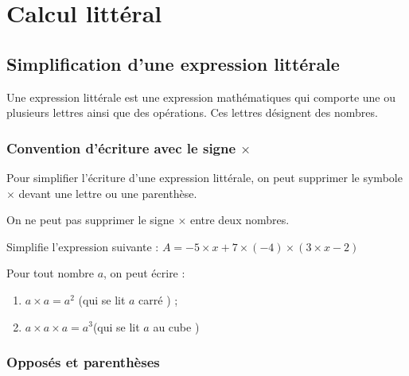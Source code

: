 \documentclass[a4paper,10pt]{report}
\begin{document}
\newpage
\setcounter{chapter}{5}
\chapter{Calcul littéral}

\section{Simplification d'une expression littérale}

\begin{defn}
Une expression littérale est une expression mathématiques qui comporte une ou plusieurs lettres ainsi que des opérations. Ces lettres désignent des nombres.
\end{defn}

\subsection{Convention d'écriture avec le signe $\times$}

\begin{memento}
Pour simplifier l'écriture d'une expression littérale, on peut supprimer le symbole $\times$ devant une lettre ou une parenthèse.
\end{memento}

\begin{rem}
On ne peut pas supprimer le signe $\times $ entre deux nombres.
\end{rem}

\begin{ex}
Simplifie l'expression suivante : $A=-5 \times x+7 \times (-4) \times (3 \times x-2)$

\noindent\grandscarreaux{\linewidth}{2.4cm}
\end{ex}

\begin{memento}
Pour tout nombre $a$, on peut écrire : 
\begin{enumerate}
\item[•] $a \times a = a^2$ (qui se lit \og $a$ carré \fg{}) ;
\item[•] $a \times a \times a = a^3$(qui se lit \og $a$ au cube \fg{})
\end{enumerate}
\end{memento}

\subsection{Opposés et parenthèses}
\end{document}
